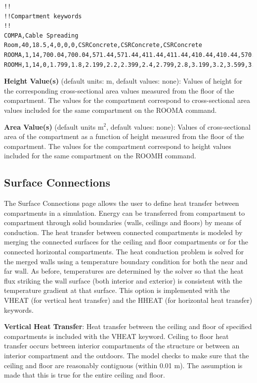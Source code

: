 \begin{lstlisting}
!!
!!Compartment keywords
!!
COMPA,Cable Spreading Room,40,18.5,4,0,0,0,CSRConcrete,CSRConcrete,CSRConcrete
ROOMA,1,14,700.04,700.04,571.44,571.44,411.44,411.44,410.44,410.44,570.44,570.44,699.04,699.04,267.04,267.04
ROOMH,1,14,0,1.799,1.8,2.199,2.2,2.399,2.4,2.799,2.8,3.199,3.2,3.599,3.6,4
\end{lstlisting}

 
\textbf{Height Value(s)} (default units: m, default values: none): Values of height for the corresponding cross-sectional area values measured from the floor of the compartment. The values for the compartment correspond to cross-sectional area values included for the same compartment on the ROOMA command.

\textbf{Area Value(s)} (default units m$^2$, default values: none): Values of cross-sectional area of the compartment as a function of height measured from the floor of the compartment. The values for the compartment correspond to height values included for the same compartment on the ROOMH command.

\subsection{Surface Connections}

The Surface Connections page allows the user to define heat transfer between compartments in a simulation. Energy can be transferred from compartment to compartment through solid boundaries (walls, ceilings and floors) by means of conduction. The heat transfer between connected compartments is modeled by merging the connected surfaces for the ceiling and floor compartments or for the connected horizontal compartments.  The heat conduction problem is solved for the merged walls using a temperature boundary condition for both the near and far wall. As before, temperatures are determined by the solver so that the heat flux striking the wall surface (both interior and exterior) is consistent with the temperature gradient at that surface.  This option is implemented with the VHEAT (for vertical heat transfer) and the HHEAT (for horizontal heat transfer) keywords. 

\textbf{Vertical Heat Transfer}: Heat transfer between the ceiling and floor of specified compartments is included with the VHEAT keyword. Ceiling to floor heat transfer occurs between interior compartments of the structure or between an interior compartment and the outdoors. The model checks to make sure that the ceiling and floor are reasonably contiguous (within 0.01 m).  The assumption is made that this is true for the entire ceiling and floor.

